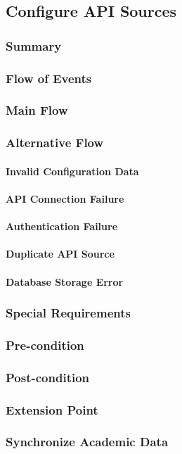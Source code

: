 \subsection{Configure API Sources}
\subsubsection{Summary}

\subsubsection{Flow of Events}
\subsubsection*{Main Flow}

\subsubsection*{Alternative Flow}
\paragraph{Invalid Configuration Data}

\paragraph{API Connection Failure}

\paragraph{Authentication Failure}

\paragraph{Duplicate API Source}

\paragraph{Database Storage Error}

\subsubsection{Special Requirements}

\subsubsection{Pre-condition}

\subsubsection{Post-condition}

\subsubsection{Extension Point}
\subsubsection*{Synchronize Academic Data}
